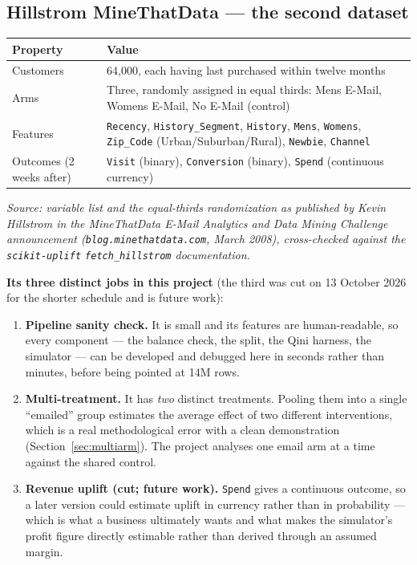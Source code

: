 \documentclass[11pt,a4paper]{article}
\newcommand{\srcnote}[1]{{\footnotesize\itshape\color{teal}Source: #1}}
\begin{document}
\subsection{Hillstrom MineThatData --- the second dataset}

\begin{tabularx}{\textwidth}{@{}L{4.4cm}X@{}}
\toprule
\textbf{Property} & \textbf{Value} \\
\midrule
Customers & 64{,}000, each having last purchased within twelve months \\
Arms & Three, randomly assigned in equal thirds: Mens E-Mail, Womens E-Mail, No E-Mail (control) \\
Features & \texttt{Recency}, \texttt{History\_Segment}, \texttt{History}, \texttt{Mens},
\texttt{Womens}, \texttt{Zip\_Code} (Urban/Suburban/Rural), \texttt{Newbie}, \texttt{Channel} \\
Outcomes (2 weeks after) & \texttt{Visit} (binary), \texttt{Conversion} (binary), \texttt{Spend}
(continuous currency) \\
\bottomrule
\end{tabularx}

\srcnote{variable list and the equal-thirds randomization as published by Kevin Hillstrom in the
MineThatData E-Mail Analytics and Data Mining Challenge announcement
(\texttt{blog.minethatdata.com}, March 2008), cross-checked against the \texttt{scikit-uplift}
\texttt{fetch\_hillstrom} documentation.}

\textbf{Its three distinct jobs in this project} (the third was cut on 13 October 2026 for the
shorter schedule and is future work):
\begin{enumerate}
\item \textbf{Pipeline sanity check.} It is small and its features are human-readable, so every
component --- the balance check, the split, the Qini harness, the simulator --- can be developed
and debugged here in seconds rather than minutes, before being pointed at 14M rows.
\item \textbf{Multi-treatment.} It has \emph{two} distinct treatments. Pooling them into a single
``emailed'' group estimates the average effect of two different interventions, which is a real
methodological error with a clean demonstration (Section~\ref{sec:multiarm}). The project
analyses one email arm at a time against the shared control.
\item \textbf{Revenue uplift (cut; future work).} \texttt{Spend} gives a continuous outcome, so a later version could
estimate uplift in currency rather than in probability --- which is what a business ultimately
wants and what makes the simulator's profit figure directly estimable rather than derived through
an assumed margin.
\end{enumerate}
\end{document}
